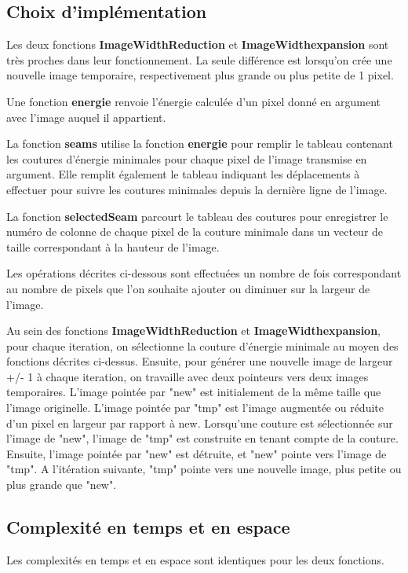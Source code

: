 \documentclass[10pt]{article}
\begin{document}
\subsection{Choix d'implémentation}
Les deux fonctions \textbf{ImageWidthReduction} et \textbf{ImageWidthexpansion} sont très proches dans leur fonctionnement. La seule différence est lorsqu'on crée une nouvelle image temporaire, respectivement plus grande ou plus petite de 1 pixel.

Une fonction \textbf{energie} renvoie l'énergie calculée d'un pixel donné en argument avec l'image auquel il appartient.

La fonction \textbf{seams} utilise la fonction \textbf{energie} pour remplir le tableau contenant les coutures d'énergie minimales pour chaque pixel de l'image transmise en argument. Elle remplit également le tableau indiquant les déplacements à effectuer pour suivre les coutures minimales depuis la dernière ligne de l'image.

La fonction \textbf{selectedSeam} parcourt le tableau  des coutures pour enregistrer le numéro de colonne de chaque pixel de la couture minimale dans un vecteur de taille correspondant à la hauteur de l'image. 

Les opérations décrites ci-dessous sont effectuées un nombre de fois correspondant au nombre de pixels que l'on souhaite ajouter ou diminuer sur la largeur de l'image.

Au sein des fonctions \textbf{ImageWidthReduction} et \textbf{ImageWidthexpansion}, pour chaque iteration, on sélectionne la couture d'énergie minimale au moyen des fonctions décrites ci-dessus. Ensuite, pour générer une nouvelle image de largeur +/- 1 à chaque iteration, on travaille avec deux pointeurs vers deux images temporaires. L'image pointée par "new" est initialement de la même taille que l'image originelle. L'image pointée par "tmp" est l'image augmentée ou réduite d'un pixel en largeur par rapport à new. Lorsqu'une couture est sélectionnée sur l'image de "new", l'image de "tmp" est construite en tenant compte de la couture. Ensuite, l'image pointée par "new" est détruite, et "new" pointe vers l'image de "tmp". A l'itération suivante, "tmp" pointe vers une nouvelle image, plus petite ou plus grande que "new".

\subsection{Complexité en temps et en espace}
Les complexités en temps et en espace sont identiques pour les deux fonctions.
\end{document}
